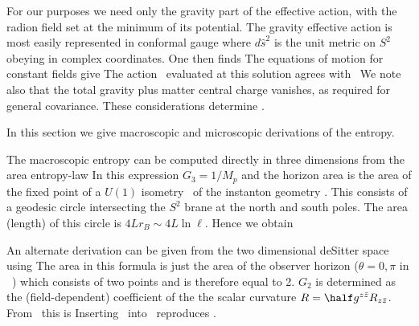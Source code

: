 For our purposes we need only the gravity
part of the effective action, with the radion field set at
the minimum of its potential. The gravity effective action
is most easily represented in conformal gauge
\eqn{}
where $d\hat s^2$ is the unit metric on $S^2$ obeying
\eqn{}
in complex coordinates.
One then finds
\eqn{}
The equations of motion for constant fields give
\eqn{}
The action \sacy\ evaluated at this solution agrees with \sfas\
We note also that the total gravity plus matter central
charge vanishes, as required for general covariance.
These considerations determine \sacy.




In this section we give macroscopic and microscopic derivations of the
entropy.

The macroscopic entropy can be computed directly in three dimensions
from the area entropy-law
\eqn{}
In this expression $G_3=1/M_p$ and the horizon area is the area of the
fixed point of a $U(1)$ isometry \hhu\ of the instanton geometry
\asgm. This consists of a geodesic circle intersecting the
$S^2$ brane at the north
and south poles. The area (length) of this circle is
$4Lr_B \sim 4L \ln \ell$. Hence we obtain
\eqn{}

An alternate derivation can be given from the
two dimensional deSitter space using
\eqn{}
The area in this formula is just the area of the observer horizon
($\theta=0,\pi$ in \rtzy\ ) which consists of two points and is therefore
equal to 2.  $G_2$ is determined as the (field-dependent) coefficient of
the the scalar curvature $R=\half g^{z \bar z}R_{z \bar z}$.
{}From \sacy\ this is
\eqn{}
Inserting \fyj\ into \sfj\ reproduces
\wki.

